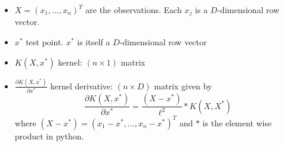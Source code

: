 \documentclass[11pt, oneside]{article}   	%
\begin{document}
\begin{itemize}
\item $X = (x_1, \dots, x_n)^T$ are the observations. Each $x_j$ is a $D$-dimensional row vector.
\item $x^*$ test point. $x^*$ is itself a $D$-dimensional row vector
\item $K(X, x^*)$ kernel: $(n \times 1)$ matrix
\item $\frac{\partial K(X, x^*)}{\partial x^*}$ kernel derivative: $(n \times D)$ matrix given by
\begin{equation}
\frac{\partial K(X, x^*)}{\partial x^*} = \frac{(X - x^*)}{\ell^2} * K(X, X^*)
\end{equation}
where $(X - x^*) = (x_1 - x^*, \dots, x_n - x^*)^T$ and $*$ is the element wise product in python.
\end{itemize}
\end{document}
